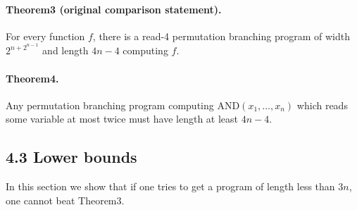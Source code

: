 \documentclass[10pt,a4paper]{article}
\begin{document}
\paragraph{Theorem3 (original comparison statement).} For every function $f$, there is a read-4 permutation branching program of width $2^{n+2^{n-1}}$ and length $4n-4$ computing $f$.

\paragraph{Theorem4.} Any permutation branching program computing $\mathrm{AND}(x_1,\ldots,x_n)$ which reads some variable at most twice must have length at least $4n-4$.

\subsection*{4.3 Lower bounds}
In this section we show that if one tries to get a program of length less than $3n$, one cannot beat Theorem3.
\end{document}
